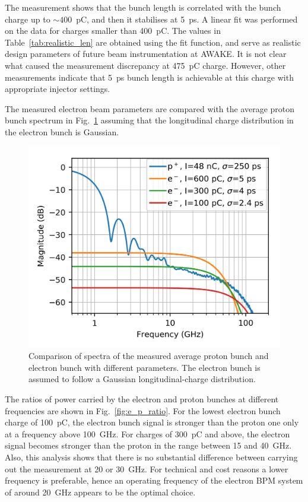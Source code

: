 The measurement shows that the bunch length is correlated with the bunch charge up to $\sim400$~pC, and then it stabilises at 5~ps. A linear fit was performed on the data for charges smaller than 400~pC. The values in Table~\ref{tab:realistic_len} are obtained using the fit function, and serve as realistic design parameters of future beam instrumentation at AWAKE. It is not clear what caused the measurement discrepancy at 475~pC charge. However, other measurements indicate that 5~ps bunch length is achievable at this charge with appropriate injector settings. 

The measured electron beam parameters are compared with the average proton bunch spectrum in Fig.~\ref{fig:e_p_spectra} assuming that the longitudinal charge distribution in the electron bunch is Gaussian.
\begin{figure}[!h]
\centering
\includegraphics[scale=1, keepaspectratio]{pictures/e_p_spectra_real}
\caption{Comparison of spectra of the measured average proton bunch and electron bunch with different parameters. The electron bunch is assumed to follow a Gaussian longitudinal-charge distribution.}
\label{fig:e_p_spectra}
\end{figure}




The ratios of power carried by the electron and proton bunches at different frequencies are shown in Fig.~\ref{fig:e_p_ratio}. For the lowest electron bunch charge of 100~pC, the electron bunch signal is stronger than the proton one only at a frequency above 100~GHz. For charges of 300~pC and above, the electron signal becomes stronger than the proton in the range between 15 and 40~GHz. Also, this analysis shows that there is no substantial difference between carrying out the measurement at 20 or 30~GHz. For technical and cost reasons a lower frequency is preferable, hence an operating frequency of the electron BPM system of around 20~GHz appears to be the optimal choice. 

